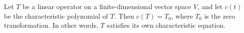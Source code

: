 \documentclass{article}
\begin{document}
Let $T$ be a linear operator on a finite-dimensional vector space $V$, and let $c(t)$ be the characteristic polynomial of $T$.  Then $c(T)=T_0$, where $T_0$ is the zero transformation. In other words, $T$ satisfies its own characteristic equation.
\end{document}
